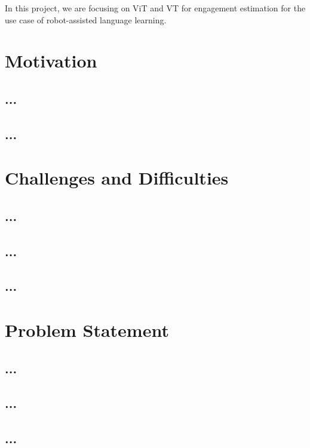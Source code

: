 \documentclass[report.tex]{subfiles}
\begin{document}
In this project, we are focusing on ViT and VT for engagement estimation for the use case of robot-assisted language learning.


    \section{Motivation}
    \subsection{...}


    \subsection{...}


    \section{Challenges and Difficulties}
    \subsection{...}


    \subsection{...}

    \subsection{...}



    \section{Problem Statement}
    \subsection{...}


    \subsection{...}


    \subsection{...}
\end{document}
